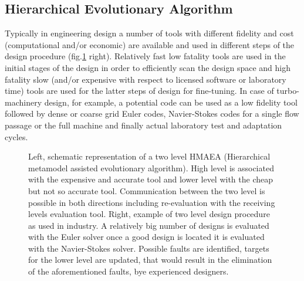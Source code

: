 \subsection{Hierarchical Evolutionary Algorithm}
Typically in engineering design a number of tools with different fidelity and cost (computational and/or economic) are available and used in different steps of the design procedure (fig.\ref{HMAEA} right). Relatively fast low fatality tools are used in the initial stages of the design in order to efficiently scan the design space and high fatality slow (and/or expensive with respect to licensed software or laboratory time) tools are used for the latter steps of design for fine-tuning. In case of turbo-machinery design, for example, a potential code can be used as a low fidelity tool followed by dense or coarse grid Euler codes, Navier-Stokes codes for a single flow passage or the full machine and finally actual laboratory test and adaptation cycles.    


\begin{figure}[h!]
\begin{minipage}[b]{1.0\linewidth}
 \centering
\end{minipage}
\caption{Left, schematic representation of a two level HMAEA (Hierarchical metamodel assisted evolutionary algorithm). High level is associated with the expensive and accurate tool and lower level with the cheap but not so accurate tool. Communication between the two level is possible in both directions including re-evaluation with the receiving levels evaluation tool. Right, example of two level design procedure as used in industry. A relatively big number of designs is evaluated with the Euler solver once a good design is located it is evaluated with the Navier-Stokes solver. Possible faults are identified, targets for the lower level are updated, that would result in the  elimination of the aforementioned faults, bye experienced designers.}
\label{HMAEA}
\end{figure} 
 
